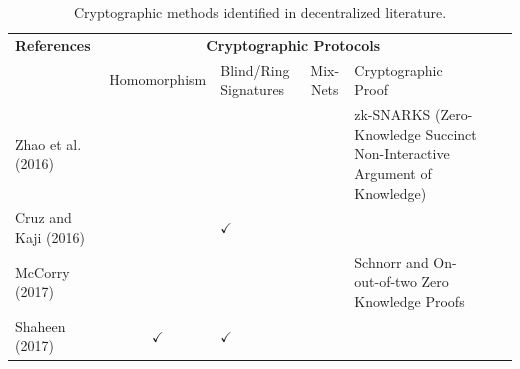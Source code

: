 \documentclass[../access.tex]{subfiles}
\begin{document}
\begin{table}[htbp]
    \caption{Cryptographic methods identified in decentralized literature.}
    \begin{adjustwidth}{-2cm}{}
        \begin{tabular}{m{4.4cm} c >{\centering\arraybackslash}m{1.7cm} c >{\centering\arraybackslash}m{6cm} >{\centering\arraybackslash} m{1.0cm} >{\centering\arraybackslash}m{14.9cm}} %
            \toprule
            \multirow{3.5}{=}{\textbf{\footnotesize{References}}}          & \multicolumn{4}{c}{\textbf{Cryptographic Protocols}}                                                                                                                                                             \\
            \cline{2-5}
            \vspace{0.5cm}
            \multirow{2}{=}{}                                              & \parbox[m]{1.7cm}{\footnotesize{Homomorphism}}       & \footnotesize{Blind/Ring Signatures} & \footnotesize{Mix-Nets} & \footnotesize{Cryptographic Proof}                                                       \\
            \hline
            \footnotesize{Zhao et al. (2016) \cite{Zhao2016}}              & {}                                                   & {}                                   & {}                      & \footnotesize{zk-SNARKS (Zero-Knowledge Succinct Non-Interactive Argument of Knowledge)} \\
            \hline
            \footnotesize{Cruz and Kaji (2016) \cite{Cruz2016}}            & {}                                                   & $ \checkmark $                       & {}                      & {}                                                                                       \\
            \hline
            \footnotesize{McCorry (2017) \cite{McCorry2017}}               & {}                                                   & {}                                   & {}                      & \footnotesize{Schnorr and On-out-of-two Zero Knowledge Proofs}                           \\
            \hline
            \footnotesize{Shaheen (2017) \cite{Shaheen2017}}               & $ \checkmark $                                       & $ \checkmark $                       & {}                      & {}                                                                                       \\

\end{tabular}
\end{adjustwidth}
\end{table}
\end{document}
